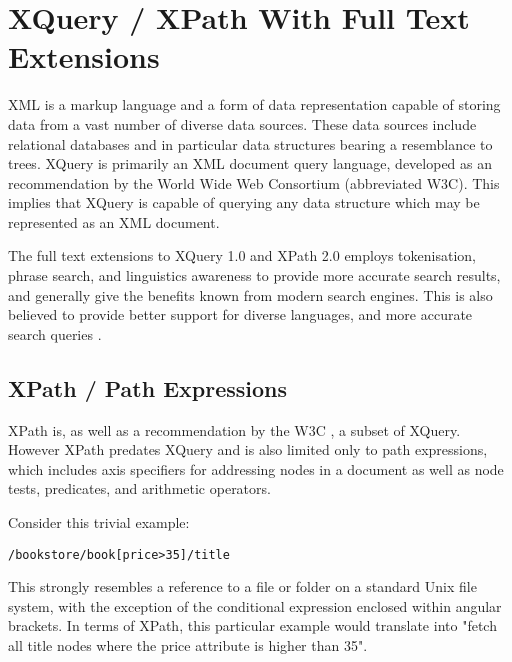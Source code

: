 \section{XQuery / XPath With Full Text Extensions}
\label{sect:theory:xquery}
XML is a markup language and a form of data representation capable of storing
data from a vast number of diverse data sources. These data sources include
relational databases and in particular data structures bearing a resemblance to
trees. XQuery is primarily an XML document query language, developed as an
recommendation by the World Wide Web Consortium\cite{w3c00} (abbreviated W3C).
This implies that XQuery is capable of querying any data structure which may be
represented as an XML document.

The full text extensions to XQuery 1.0 and XPath 2.0 employs tokenisation,
phrase search, and linguistics awareness to provide more accurate search
results, and generally give the benefits known from modern search engines.
This is also believed to provide better support for diverse languages, and more
accurate search queries \cite{w3c02}.

\subsection{XPath / Path Expressions}
XPath is, as well as a recommendation by the W3C \cite{w3c01}, a subset of
XQuery. However XPath predates XQuery and is also limited only to path
expressions, which includes axis specifiers for addressing nodes in a document
as well as node tests, predicates, and arithmetic operators.

Consider this trivial example\cite{w3s00}:
\begin{Verbatim}
/bookstore/book[price>35]/title
\end{Verbatim}
This strongly resembles a reference to a file or folder on a standard Unix file
system, with the exception of the conditional expression enclosed within
angular brackets. In terms of XPath, this particular example would translate
into "fetch all title nodes where the price attribute is higher than 35".

